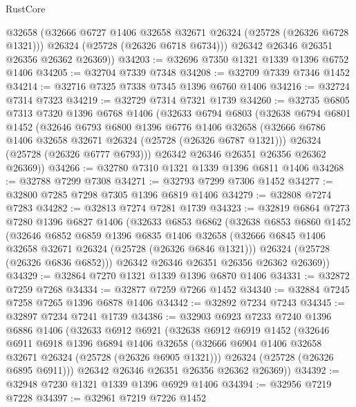 \begin{lexlean}{RustCore}
\begin{coremodule}
          @32658
          (@32666 @6727 @1406 @32658 @32671 @26324 (@25728 (@26326 @6728 @1321)))
          @26324
          (@25728 (@26326 @6718 @6734)))
        @26342
        @26346
        @26351
        @26356
        @26362
        @26369))
@34203 := @32696 @7350 @1321 @1339 @1396 @6752 @1406
@34205 := @32704 @7339 @7348
@34208 := @32709 @7339 @7346 @1452
@34214 := @32716 @7325 @7338 @7345 @1396 @6760 @1406
@34216 := @32724 @7314 @7323
@34219 := @32729 @7314 @7321 @1739
@34260 := @32735
    @6805
    @7313
    @7320
    @1396
    @6768
    @1406
    (@32633
      @6794
      @6803
      (@32638
        @6794
        @6801
        @1452
        (@32646
          @6793
          @6800
          @1396
          @6776
          @1406
          @32658
          (@32666 @6786 @1406 @32658 @32671 @26324 (@25728 (@26326 @6787 @1321)))
          @26324
          (@25728 (@26326 @6777 @6793)))
        @26342
        @26346
        @26351
        @26356
        @26362
        @26369))
@34266 := @32780 @7310 @1321 @1339 @1396 @6811 @1406
@34268 := @32788 @7299 @7308
@34271 := @32793 @7299 @7306 @1452
@34277 := @32800 @7285 @7298 @7305 @1396 @6819 @1406
@34279 := @32808 @7274 @7283
@34282 := @32813 @7274 @7281 @1739
@34323 := @32819
    @6864
    @7273
    @7280
    @1396
    @6827
    @1406
    (@32633
      @6853
      @6862
      (@32638
        @6853
        @6860
        @1452
        (@32646
          @6852
          @6859
          @1396
          @6835
          @1406
          @32658
          (@32666 @6845 @1406 @32658 @32671 @26324 (@25728 (@26326 @6846 @1321)))
          @26324
          (@25728 (@26326 @6836 @6852)))
        @26342
        @26346
        @26351
        @26356
        @26362
        @26369))
@34329 := @32864 @7270 @1321 @1339 @1396 @6870 @1406
@34331 := @32872 @7259 @7268
@34334 := @32877 @7259 @7266 @1452
@34340 := @32884 @7245 @7258 @7265 @1396 @6878 @1406
@34342 := @32892 @7234 @7243
@34345 := @32897 @7234 @7241 @1739
@34386 := @32903
    @6923
    @7233
    @7240
    @1396
    @6886
    @1406
    (@32633
      @6912
      @6921
      (@32638
        @6912
        @6919
        @1452
        (@32646
          @6911
          @6918
          @1396
          @6894
          @1406
          @32658
          (@32666 @6904 @1406 @32658 @32671 @26324 (@25728 (@26326 @6905 @1321)))
          @26324
          (@25728 (@26326 @6895 @6911)))
        @26342
        @26346
        @26351
        @26356
        @26362
        @26369))
@34392 := @32948 @7230 @1321 @1339 @1396 @6929 @1406
@34394 := @32956 @7219 @7228
@34397 := @32961 @7219 @7226 @1452

\end{coremodule}
\end{lexlean}
